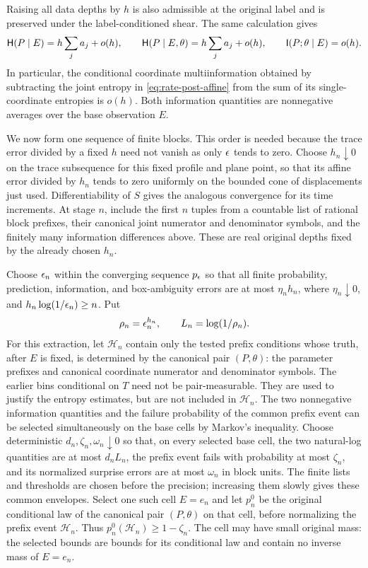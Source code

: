 Raising all data depths by $h$ is also admissible at the original
label and is preserved under the label-conditioned shear.  The same
calculation gives
\begin{equation}
 \mathsf H(P\mid E)=h\sum_j a_j+o(h),\qquad
 \mathsf H(P\mid E,\theta)=h\sum_j a_j+o(h),\qquad
 \mathsf I(P;\theta\mid E)=o(h).
 \label{eq:rate-pre-independence}
\end{equation}
In particular, the conditional coordinate multiinformation obtained
by subtracting the joint entropy in \eqref{eq:rate-post-affine}
from the sum of its single-coordinate entropies is $o(h)$.
Both information quantities are nonnegative averages over the base
observation $E$.

We now form one sequence of finite blocks.  This order is needed
because the trace error divided by a fixed $h$ need not vanish as
only $\epsilon$ tends to zero.  Choose $h_n\downarrow0$ on the trace
subsequence for this fixed profile and plane point, so that its
affine error divided by $h_n$ tends to zero uniformly on the bounded
cone of displacements just used.  Differentiability of $S$ gives
the analogous convergence for its time increments.  At stage $n$,
include the first $n$ tuples from a countable list of rational block
prefixes, their canonical joint numerator and denominator symbols,
and the finitely many information differences above.  These are
real original depths fixed by the already chosen $h_n$.

Choose $\epsilon_n$ within the converging sequence $p_\epsilon$ so that all
finite probability, prediction, information, and box-ambiguity
errors are at most $\eta_n h_n$, where $\eta_n\downarrow0$, and
$h_n\log(1/\epsilon_n)\ge n$.  Put
\[
 \rho_n=\epsilon_n^{h_n},\qquad L_n=\log(1/\rho_n).
\]
For this extraction, let $\mathcal H_n$ contain only the tested
prefix conditions whose truth, after $E$ is fixed, is determined
by the canonical pair $(P,\theta)$: the parameter prefixes and
canonical coordinate numerator and denominator symbols.  The earlier
bins conditional on $T$ need not be pair-measurable.  They are used
to justify the entropy estimates, but are not included in
$\mathcal H_n$.
The two nonnegative information quantities and the failure
probability of the common prefix event can be selected
simultaneously on the base cells by Markov's inequality.  Choose
deterministic $d_n,\zeta_n,\omega_n\downarrow0$ so that, on every
selected base cell, the two natural-log quantities are at most
$d_nL_n$, the prefix event fails with probability at most $\zeta_n$,
and its normalized surprise errors are at most $\omega_n$ in block
units.  The finite lists and thresholds are chosen before the
precision; increasing them slowly gives these common envelopes.
Select one such cell $E=e_n$ and let $p_n^0$ be the original
conditional law of the canonical pair $(P,\theta)$ on that cell,
before normalizing the prefix event $\mathcal H_n$.  Thus
$p_n^0(\mathcal H_n)\ge1-\zeta_n$.  The cell may have small original
mass: the selected bounds are bounds for its conditional law and
contain no inverse mass of $E=e_n$.

